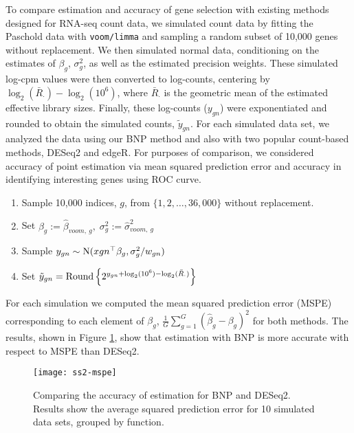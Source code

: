 To compare estimation and accuracy of gene selection with existing methods designed for RNA-seq count data, we simulated count data by fitting the Paschold data with \texttt{voom/limma} and sampling a random subset of 10,000 genes without replacement. We then simulated normal data, conditioning on the estimates of $\beta_g$, $\sigma^2_g$, as well as the estimated precision weights. These simulated log-cpm values were then converted to log-counts, centering by $\log_2(\bar{R}_\cdot)-\log_2(10^6)$, where $\bar{R}_\cdot$ is the geometric mean of the estimated effective library sizes. Finally, these log-counts ($y_{gn}$) were exponentiated and rounded to obtain the simulated counts, $\tilde{y}_{gn}$. For each simulated data set, we analyzed the data using our BNP method and also with two popular count-based methods, DESeq2 and edgeR. For purposes of comparison, we considered accuracy of point estimation via mean squared prediction error and accuracy in identifying interesting genes using ROC curve.
\begin{enumerate}
\item Sample 10,000 indices, $g$, from $\{1,2,\ldots,36,000\}$ without replacement.
\item Set $\beta_g:= \hat{\beta}_{voom,~g},\; \sigma^2_g:= \hat{\sigma}^2_{voom,~g}$
\item Sample $y_{gn} \sim \operatorname{N}(x{gn}^\top\beta_g, \sigma^2_g/w_{gn})$
\item Set $\tilde{y}_{gn} = \operatorname{Round} \left\{ 2^{y_{gn} + \log_2(10^6) - \log_2(\bar{R}_{\cdot})} \right\}$
\end{enumerate}
For each simulation we computed the mean squared prediction error (MSPE) corresponding to each element of $\beta_g$, $\frac{1}{G}\sum_{g=1}^G (\hat{\beta}_g-\beta_g)^2$ for both methods. The results, shown in Figure \ref{ss2-mspe}, show that estimation with BNP is more accurate with respect to MSPE than DESeq2.

\begin{figure}[h!]
\texttt{[image: ss2-mspe]}
\begin{minipage}{.8\textwidth}
\caption{\small Comparing the accuracy of estimation for BNP and DESeq2. Results show the average squared prediction error for 10 simulated data sets, grouped by function.}
\end{minipage}
\label{ss2-mspe}
\end{figure}



